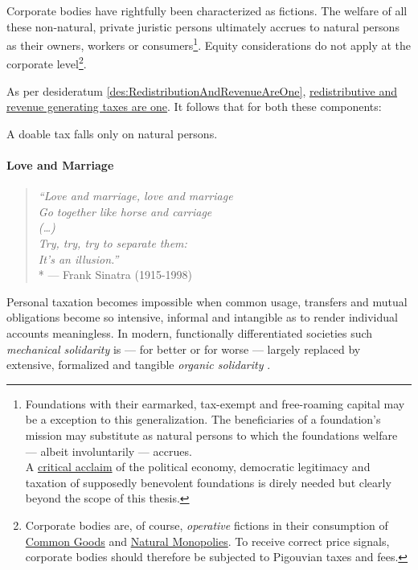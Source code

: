 

Corporate bodies have rightfully been characterized as fictions.
 The welfare of all these non-natural, private juristic persons ultimately accrues to natural persons as their owners, workers or consumers\footnote{
	Foundations with their earmarked, tax-exempt and free-roaming capital may be a exception to this generalization.
The beneficiaries of a foundation's mission may substitute as natural persons to which the foundations welfare --- albeit involuntarily --- accrues.\\A \href{http://maxheld.de/2010/03/27/foundations-may-be-bad/}{critical acclaim} of the political economy, democratic legitimacy and taxation of supposedly benevolent foundations is direly needed but clearly beyond the scope of this thesis.}.
Equity considerations do not apply at the corporate level\footnote{
	Corporate bodies are, of course, \emph{operative} fictions in their consumption of \href{sec:CommonGood}{Common Goods} and \href{sec:NaturalMonopolies}{Natural Monopolies}.
To receive correct price signals, corporate bodies should therefore be subjected to Pigouvian taxes and fees.}.

As per desideratum \ref{des:RedistributionAndRevenueAreOne}, \hyperref[des:RedistributionAndRevenueAreOne]{redistributive and revenue generating taxes are one}.
It follows that for both these components:

\begin{desideratum}
	A doable tax falls only on natural persons.
	\label{des:PersonalTaxation}
\end{desideratum}

\paragraph{Love and Marriage}  \label{sec:love-marriage}

\begin{verse}
	\emph{``Love and marriage, love and marriage\\
	Go together like horse and carriage\\
	(\ldots)\\
	Try, try, try to separate them:\\
	It's an illusion.''}\\*
	--- Frank Sinatra (1915-1998)
\end{verse}
Personal taxation becomes impossible when common usage, transfers and mutual obligations become so intensive, informal and intangible as to render individual accounts meaningless.
In modern, functionally differentiated societies such \emph{mechanical solidarity} is --- for better or for worse --- largely replaced by extensive, formalized and tangible \emph{organic solidarity} \citep{Durkheim-1893-aa}.

